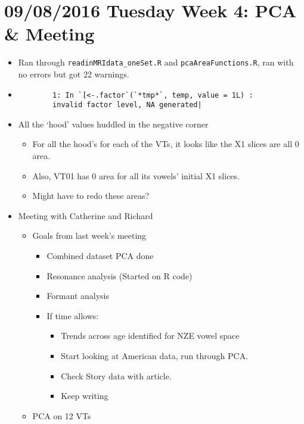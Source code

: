 \documentclass{article}
\begin{document}
\section*{09/08/2016 Tuesday Week 4: PCA \& Meeting}
\begin{itemize}
    \item Ran through \verb|readinMRIdata_oneSet.R| and \verb|pcaAreaFunctions.R|, ran with no errors but got 22 warnings.
    \item \begin{verbatim}
        1: In `[<-.factor`(`*tmp*`, temp, value = 1L) :
        invalid factor level, NA generated|    
    \end{verbatim}
    \item All the `hood' values huddled in the negative corner
    \begin{itemize}
        \item For all the hood's for each of the VTs, it looks like the X1 slices are all 0 area.
        \item Also, VT01 has 0 area for all its vowels' initial X1 slices.
        \item Might have to redo these areas?
    \end{itemize}
    \item Meeting with Catherine and Richard
    \begin{itemize}
        \item Goals from last week's meeting
        \begin{itemize}
            \item Combined dataset PCA done
            \item Resonance analysis (Started on R code)
            \item Formant analysis
            \item If time allows:
            \begin{itemize}
                \item Trends across age identified for NZE vowel space
                \item Start looking at American data, run through PCA.
                \item Check Story data with article.
                \item Keep writing
            \end{itemize}
        \end{itemize}
        \item PCA on 12 VTs
        \begin{itemize}

\end{itemize}
\end{itemize}
\end{itemize}
\end{document}
